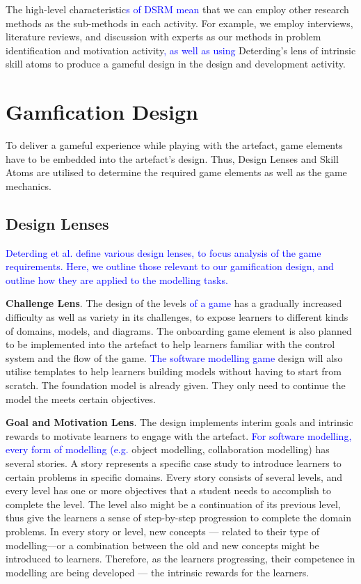 \documentclass[runningheads,a4paper]{llncs}
\begin{document}
The high-level characteristic\textcolor{blue}{s of DSRM mean} that we can employ other research methods as the sub-methods in each activity. For example, we employ interviews, literature reviews, and discussion with experts as our methods in problem identification and motivation activity\textcolor{blue}{, as well as using} Deterding's lens of intrinsic skill atoms \cite{deterding2015lens} to produce a gameful design in the design and development activity.

\section{Gamfication Design}
To deliver a gameful experience while playing with the artefact, game elements have to be embedded into the artefact's design. Thus, Design Lenses and Skill Atoms \cite{deterding2015lens} are utilised to determine the required game elements as well as the game mechanics. 

\subsection{Design Lenses}
\textcolor{blue}{Deterding et al.  \cite{deterding2015lens} define various design lenses, to focus analysis of the game requirements.  Here, we outline those relevant to our gamification design, and outline how they are applied to the modelling tasks.}

\textbf{Challenge Lens}. The design of the levels \textcolor{blue}{of a game} has a gradually increased difficulty as well as variety in its challenges, to expose learners to different kinds of domains, models, and diagrams. The onboarding game element is also planned to be implemented into the artefact to help learners familiar with the control system and the flow of the game. \textcolor{blue}{The software modelling game }design will also utilise templates to help learners building models without having to start from scratch. The foundation model is already given. They only need to continue the model the meets certain objectives.

\textbf{Goal and Motivation Lens}. The design implements interim goals and intrinsic rewards to motivate learners to engage with the artefact. \textcolor{blue}{For software modelling, every form of modelling (e.g.} object modelling, collaboration modelling) has several stories. A story represents a specific case study to introduce learners to certain problems in specific domains. Every story consists of several levels, and every level has one or more objectives that a student needs to accomplish to complete the level. The level also might be a continuation of its previous level, thus give the learners a sense of step-by-step progression to complete the domain problems. In every story or level, new concepts --- related to their type of modelling---or a combination between the old and new concepts might be introduced to learners. Therefore, as the learners progressing, their competence in modelling are being developed --- the intrinsic rewards for the learners. 
\end{document}

